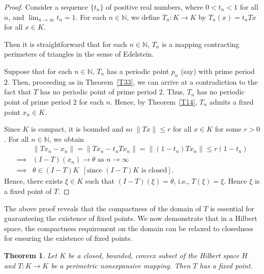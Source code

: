 \documentclass[11pt,reqno]{amsart}
\newtheorem{theorem}{Theorem}[section]
\theoremstyle{definition}
\newtheorem{Open Prob}[theorem]{Open Problem}
\theoremstyle{remark}
\numberwithin{equation}{section}
\begin{document}
\begin{proof}
Consider a sequence $\{t_n\}$ of positive real numbers, where $0 < t_n < 1$ for all $n$, and $\lim_{n \to \infty} t_n = 1$. For each $n \in \mathbb{N}$, we define $T_n:K \to K$ by $T_n (x)=t_n Tx$ for all $x \in K$.

Then it is straightforward that for each $n\in \mathbb{N}$, $T_n$ is a mapping contracting perimeters of triangles in the sense of Edelstein.

Suppose that for each $n \in \mathbb{N}$, $T_n$ has a periodic point $p_n$ (say) with prime period $2$. Then, proceeding as in Theorem~\ref{T33}, we can arrive at a contradiction to the fact that $T$ has no periodic point of prime period $2$. Thus, $T_n$ has no periodic point of prime period $2$ for each $n$. Hence, by Theorem~\ref{T14}, $T_n$ admits a fixed point  $x_n \in K$. 

Since $K$ is compact,  it is bounded and so $\lVert Tx \rVert \le r$ for all $x \in K$ for some $r>0$.
For all $n \in \mathbb{N}$, we obtain 
\begin{align*}
&\lVert Tx_n - x_n \rVert = \lVert Tx_n - t_n Tx_n \rVert = \lVert (1-t_n) Tx_n \rVert \le r(1-t_n)\\
\implies &(I-T)(x_n) \to \theta \text{ as } n \to \infty\\
\implies &\theta \in (I-T)K~~ [\text{since $(I-T)K$ is closed} ] .
\end{align*}
Hence, there exists $\xi \in K$ such that $(I-T)(\xi)= \theta$, i.e., $T (\xi)=\xi$.
Hence $\xi$ is a fixed point of $T$.
\end{proof}

The above proof reveals that the compactness of the domain of $T$ is essential for guaranteeing the existence of fixed points. We now demonstrate that in a Hilbert space, the compactness requirement on the domain can be relaxed to closedness for ensuring the existence of fixed points.
\begin{theorem}\label{T35}
Let $K$ be a closed, bounded, convex subset of the Hilbert space $H$ and  $T: K \to K$ be a perimetric nonexpansive mapping. Then $T$ has a fixed point.
\end{theorem}
\end{document}
